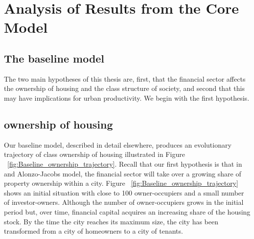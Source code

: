 \chapter{Analysis of Results from the Core Model} \label{chapter-analysis}


\section{The baseline model} 
The two main hypotheses of this thesis are, first,  that the financial sector affects the ownership of housing and the class structure of society, and second that this may have implications for urban productivity. We begin with the first hypothesis.

\begin{center}
\end{center}
\section{ownership of housing}

Our baseline model, described in detail elsewhere, produces an evolutionary trajectory of class ownership of housing illustrated in Figure ~\ref{fig:Baseline_ownership_trajectory}. Recall that our first hypothesis is that in and \Gls{Alonzo-Jacobs model}, the financial sector will take over a growing share of property ownership within a city. Figure ~\ref{fig:Baseline_ownership_trajectory} shows an initial situation with close to 100 owner-occupiers and a small number of investor-owners. Although the number of owner-occupiers grows in the initial period but, over time, financial capital acquires an increasing share of the housing stock. By the time the city reaches its maximum size, the city has been transformed from a city of homeowners to a city of tenants.  

